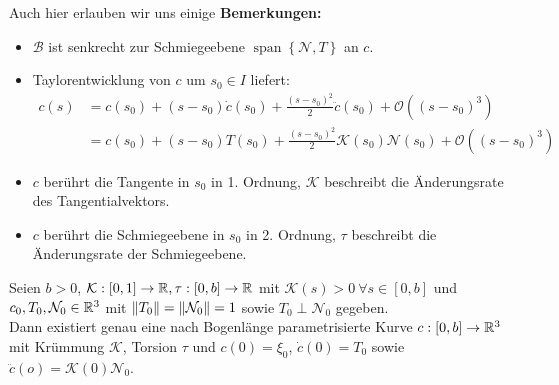 Auch hier erlauben wir uns einige \textbf{Bemerkungen:}
\begin{itemize}
	\item $\mathcal{B}$ ist senkrecht zur Schmiegeebene $\operatorname{span}\left\{\mathcal{N},T\right\}$ an $c$.
	\item Taylorentwicklung von $c$ um $s_0 \in I$ liefert:
	\begin{align*}
	c(s) &= c(s_0)	+ (s-s_0)\dot{c}(s_0) + \frac{(s-s_0)^2}{2}\ddot{c}(s_0) + \mathcal{O}((s-s_0)^3) \\
	     &= c(s_0) + (s-s_0)T(s_0) + \frac{(s-s_0)^2}{2}\mathcal{K}(s_0)\mathcal{N}(s_0) + \mathcal{O}((s-s_0)^3)
	\end{align*}
	\item $c$ berührt die Tangente in $s_0$ in 1. Ordnung, $\mathcal{K}$ beschreibt die Änderungsrate des Tangentialvektors.
	\item $c$ berührt die Schmiegeebene in $s_0$ in 2. Ordnung, $\tau$ beschreibt die Änderungsrate der Schmiegeebene. 
\end{itemize}
\begin{satz}
	Seien $b>0$, $\mathcal{K}: [0,1]\rightarrow \mathbb{R}, \tau: [0,b]\rightarrow \mathbb{R}$ mit $\mathcal{K}(s)>0 \ \forall s \in [0,b]$ und $c_0, T_0, \mathcal{N}_0 \in \mathbb{R}^3$ mit $\norm{T_0} = \norm{\mathcal{N}_0} = 1$ sowie $T_0 \perp \mathcal{N}_0$ gegeben. \\
	Dann existiert genau eine nach Bogenlänge parametrisierte Kurve $c:[0,b]\rightarrow\mathbb{R}^3$ mit Krümmung $\mathcal{K}$, Torsion $\tau$ und $c(0) = \xi_0$, $\dot{c}(0) = T_0$ sowie $\ddot{c}(o) = \mathcal{K}(0)\mathcal{N}_0$.
\end{satz}
